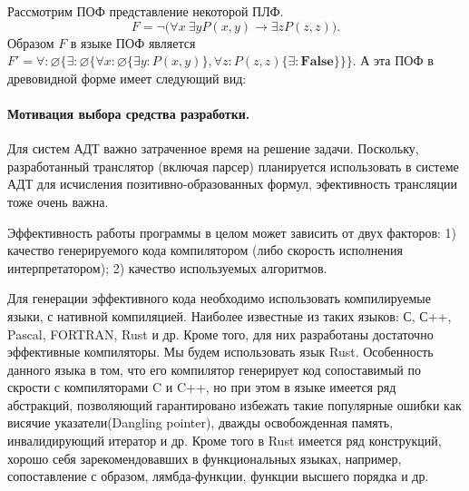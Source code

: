 \documentclass[a4paper]{jctart15b}
\begin{document}
\begin{example}
Рассмотрим ПОФ представление некоторой ПЛФ.
$$F= \neg\bigl(\forall x\:\exists y P(x,y)\rightarrow \exists z P(z,z)\bigr).$$
Образом $F$ в языке ПОФ является $F' = \forall\colon \varnothing\{\exists\colon\varnothing\{\forall x\colon\varnothing\{\exists y\colon P(x,y)\}, \forall z\colon P(z,z)\{\exists\colon\boldsymbol{False}\}\}\}.$
А эта ПОФ в древовидной форме имеет следующий вид:
\begin{center}
\end{center}
\end{example}

\paragraph{Мотивация выбора средства разработки.}
Для систем АДТ важно затраченное время на решение задачи. Поскольку, разработанный транслятор (включая парсер) планируется использовать в системе АДТ для исчисления позитивно-образованных формул, эфективность трансляции тоже очень важна.

Эффективность работы программы в целом может зависить от двух факторов: 1) качество генерируемого кода компилятором (либо скорость исполнения интерпретатором); 2) качество используемых алгоритмов.

Для генерации эффективного кода необходимо использовать компилируемые языки, с нативной компиляцией. Наиболее известные из таких языков: С, С++, Pascal, FORTRAN, Rust и др. Кроме того, для них разработаны достаточно эффективные компиляторы. Мы будем использовать язык Rust. Особенность данного языка в том, что его компилятор генерирует код сопоставимый по скрости с компиляторами C и C++, но при этом в языке имеется ряд абстракций, позволяющий гарантировано избежать такие популярные ошибки как висячие указатели(Dangling pointer), дважды освобожденная память, инвалидирующий итератор и др. Кроме того в Rust имеется ряд конструкций, хорошо себя зарекомендовавших в функциональных языках, например, сопоставление с образом, лямбда-функции, функции высшего порядка и др.
\end{document}
